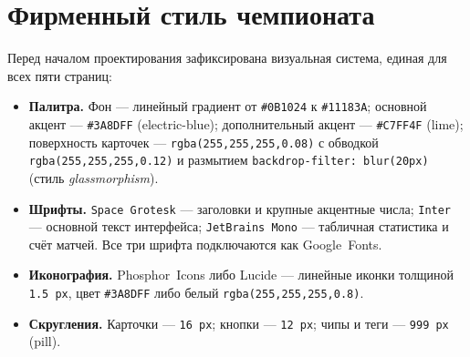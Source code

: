 \section{Фирменный стиль чемпионата}

Перед началом проектирования зафиксирована визуальная система,
единая для всех пяти страниц:

\begin{itemize}
  \item \textbf{Палитра.} Фон --- линейный градиент от
        \texttt{\#0B1024} к \texttt{\#11183A}; основной акцент ---
        \texttt{\#3A8DFF} (electric-blue); дополнительный акцент ---
        \texttt{\#C7FF4F} (lime); поверхность карточек ---
        \texttt{rgba(255,255,255,0.08)} с обводкой
        \texttt{rgba(255,255,255,0.12)} и размытием
        \texttt{backdrop-filter:~blur(20px)} (стиль
        \emph{glassmorphism}).
  \item \textbf{Шрифты.}
        \texttt{Space~Grotesk} --- заголовки и крупные акцентные числа;
        \texttt{Inter} --- основной текст интерфейса;
        \texttt{JetBrains~Mono} --- табличная статистика и счёт матчей.
        Все три шрифта подключаются как Google~Fonts.
  \item \textbf{Иконография.} Phosphor~Icons либо Lucide --- линейные
        иконки толщиной \texttt{1.5\,px}, цвет \texttt{\#3A8DFF} либо
        белый \texttt{rgba(255,255,255,0.8)}.
  \item \textbf{Скругления.} Карточки --- \texttt{16\,px}; кнопки ---
        \texttt{12\,px}; чипы и теги --- \texttt{999\,px} (pill).
\end{itemize}

\endinput
